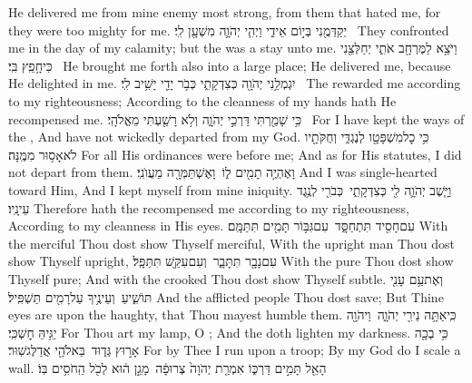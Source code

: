 {He delivered me from mine enemy most strong, from them that hated me, for they were too mighty for me.}
{יְקַדְּמֻ֖נִי בְּי֣וֹם אֵידִ֑י וַיְהִ֧י יְהֹוָ֛ה מִשְׁעָ֖ן לִֽי׃ \setuma }
{They confronted me in the day of my calamity; but the \lord\space was a stay unto me.}
{וַיֹּצֵ֥א לַמֶּרְחָ֖ב אֹתִ֑י יְחַלְּצֵ֖נִי כִּי\maqqaf חָ֥פֵֽץ בִּֽי׃ \setuma }
{He brought me forth also into a large place; He delivered me, because He delighted in me.}
{יִגְמְלֵ֥נִי יְהֹוָ֖ה כְּצִדְקָתִ֑י כְּבֹ֥ר יָדַ֖י יָשִׁ֥יב לִֽי׃ \setuma }
{The \lord\space rewarded me according to my righteousness; According to the cleanness of my hands hath He recompensed me.}
{כִּ֥י שָׁמַ֖רְתִּי דַּרְכֵ֣י יְהֹוָ֑ה וְלֹ֥א רָשַׁ֖עְתִּי מֵאֱלֹהָֽי׃ \setuma }
{For I have kept the ways of the \lord, And have not wickedly departed from my God.}
{כִּ֥י כׇל\maqqaf מִשְׁפָּטָ֖ו לְנֶגְדִּ֑י וְחֻקֹּתָ֖יו לֹא\maqqaf אָס֥וּר מִמֶּֽנָּה׃}
{For all His ordinances were before me; And as for His statutes, I did not depart from them.}
{וָאֶהְיֶ֥ה תָמִ֖ים ל֑וֹ \setuma  וָאֶשְׁתַּמְּרָ֖ה מֵעֲוֺנִֽי׃}
{And I was single-hearted toward Him, And I kept myself from mine iniquity.}
{וַיָּ֧שֶׁב יְהֹוָ֛ה לִ֖י כְּצִדְקָתִ֑י \setuma  כְּבֹרִ֖י לְנֶ֥גֶד עֵינָֽיו׃}
{Therefore hath the \lord\space recompensed me according to my righteousness, According to my cleanness in His eyes.}
{עִם\maqqaf חָסִ֖יד תִּתְחַסָּ֑ד \setuma  עִם\maqqaf גִּבּ֥וֹר תָּמִ֖ים תִּתַּמָּֽם׃}
{With the merciful Thou dost show Thyself merciful, With the upright man Thou dost show Thyself upright,}
{עִם\maqqaf נָבָ֖ר תִּתָּבָ֑ר \setuma  וְעִם\maqqaf עִקֵּ֖שׁ תִּתַּפָּֽל׃}
{With the pure Thou dost show Thyself pure; And with the crooked Thou dost show Thyself subtle.}
{וְאֶת\maqqaf עַ֥ם עָנִ֖י תּוֹשִׁ֑יעַ \setuma  וְעֵינֶ֥יךָ עַל\maqqaf רָמִ֖ים תַּשְׁפִּֽיל׃}
{And the afflicted people Thou dost save; But Thine eyes are upon the haughty, that Thou mayest humble them.}
{כִּֽי\maqqaf אַתָּ֥ה נֵירִ֖י יְהֹוָ֑ה \setuma  וַיהֹוָ֖ה יַגִּ֥יהַּ חׇשְׁכִּֽי׃}
{For Thou art my lamp, O \lord; And the \lord\space doth lighten my darkness.}
{כִּ֥י בְכָ֖ה אָר֣וּץ גְּד֑וּד \setuma  בֵּאלֹהַ֖י אֲדַלֶּג\maqqaf שֽׁוּר׃}
{For by Thee I run upon a troop; By my God do I scale a wall.}
{הָאֵ֖ל תָּמִ֣ים דַּרְכּ֑וֹ אִמְרַ֤ת יְהֹוָה֙ צְרוּפָ֔ה \setuma  מָגֵ֣ן ה֔וּא לְכֹ֖ל הַֽחֹסִ֥ים בּֽוֹ׃}
